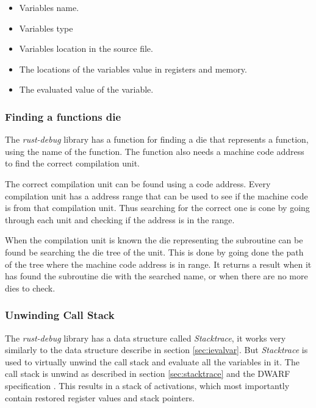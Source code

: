\begin{itemize}
  \item Variables name.
  \item Variables type
  \item Variables location in the source file.
  \item The locations of the variables value in registers and memory.
  \item The evaluated value of the variable.
\end{itemize}


\subsubsection{Finding a functions \gls{die}} \label{sec:funcdie}
The \emph{rust-debug} library has a function for finding a \gls{die} that represents a function, using the name of the function.
The function also needs a machine code address to find the correct compilation unit.


The correct compilation unit can be found using a code address.
Every compilation unit has a address range that can be used to see if the machine code is from that compilation unit.
Thus searching for the correct one is cone by going through each unit and checking if the address is in the range.


When the compilation unit is known the \gls{die} representing the subroutine can be found be searching the \gls{die} tree of the unit.
This is done by going done the path of the tree where the machine code address is in range.
It returns a result when it has found the subroutine \gls{die} with the searched name, or when there are no more \glspl{die} to check.


\subsubsection{Unwinding Call Stack}
The \emph{rust-debug} library has a data structure called \emph{Stacktrace}, it works very similarly to the data structure describe in section \ref{sec:ievalvar}.
But \emph{Stacktrace} is used to virtually unwind the call stack and evaluate all the variables in it.
The call stack is unwind as described in section \ref{sec:stacktrace} and the \gls{DWARF} specification \cite{dwarf}.
This results in a stack of activations, which most importantly contain restored register values and stack pointers.


